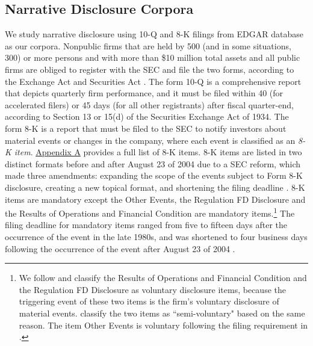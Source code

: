 \documentclass[letterpaper,11pt]{article}
\begin{document}
\begin{spacing}{1.5}
\subsection{Narrative Disclosure Corpora} \label{sec3.2}
\noindent We study narrative disclosure using 10-Q and 8-K filings from EDGAR database as our corpora. Nonpublic firms that are held by 500 (and in some situations, 300) or more persons and with more than \$10 million total assets and all public firms are obliged to register with the SEC and file the two forms, according to the Exchange Act and Securities Act \cite{segalAreManagersStrategic2016}. The form 10-Q is a comprehensive report that depicts quarterly firm performance, and it must be filed within 40 (for accelerated filers) or 45 days (for all other registrants) after fiscal quarter-end, according to Section 13 or 15(d) of the Securities Exchange Act of 1934. The form 8-K is a report that must be filed to the SEC to notify investors about material events or changes in the company, where each event is classified as an \textit{8-K item}. \hyperref[appa]{Appendix A} provides a full list of 8-K items. 8-K items are listed in two distinct formats before and after August 23 of 2004 due to a SEC reform, which made three amendments: expanding the scope of the events subject to Form 8-K disclosure, creating a new topical format, and shortening the filing deadline \cite{secFinalRuleAdditional2004, lermanNewForm8K2010}. 8-K items are mandatory except the Other Events, the Regulation FD Disclosure and the Results of Operations and Financial Condition are mandatory items.\footnote{We follow  and classify the Results of Operations and Financial Condition and the Regulation FD Disclosure as voluntary disclosure items, because the triggering event of these two items is the firm's voluntary disclosure of material events.  classify the two items as ``semi-voluntary" based on the same reason. The item Other Events is voluntary following the filing requirement in . } The filing deadline for mandatory items ranged from five to fifteen days after the occurrence of the event in the late 1980s, and was shortened to four business days following the occurrence of the event after August 23 of 2004 \cite{lermanNewForm8K2010}.


\end{spacing}
\end{document}
